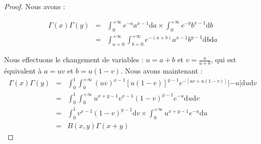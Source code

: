 
\begin{proof}
Nous avons :

\begin{eqnarray*}
\Gamma(x)\Gamma(y) &=& \int_0^{+\infty} e^{-a}a^{x-1}\mathrm{d}a \times  \int_0^{+\infty} e^{-b}b^{x-1}\mathrm{d}b\\
&=& \int_{a=0}^{+\infty} \int_{b=0}^{+\infty} e^{-(a+b)}a^{x-1}b^{y-1}\mathrm{d}b\mathrm{d}a
\end{eqnarray*}

Nous effectuons le changement de variables : $u=a+b$ et $\displaystyle v=\frac{a}{a+b}$, qui est équivalent à $a=uv$ et $b=u(1-v)$. Nous avons maintenant :
\\
\begin{eqnarray*}
\Gamma(x)\Gamma(y) &=& \int_0^1\int_0^{+\infty} (uv)^{x-1}\left[u(1-v)\right]^{y-1}e^{-[uv+u(1-v)]}|-u|\mathrm{d}u\mathrm{d}v\\
&=& \int_0^1\int_0^{+\infty}u^{x+y-1}v^{x-1}(1-v)^{y-1}e^{-u}\mathrm{d}u\mathrm{d}v\\
&=& \int_0^1 v^{x-1}(1-v)^{y-1}\mathrm{d}v \times \int_0^{+\infty}u^{x+y-1}e^{-u}\mathrm{d}u\\
&=& B(x, y)\Gamma(x+y)
\end{eqnarray*}
\end{proof}



